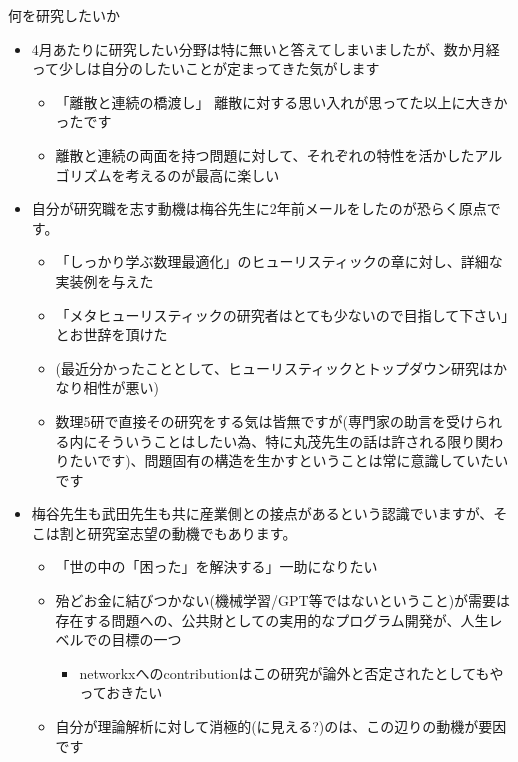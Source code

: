 \documentclass[13pt,aspectratio=169,table,dvipdfmx]{beamer}
\begin{document}
    \begin{frame}{何を研究したいか}
        \begin{itemize}
            \item 4月あたりに研究したい分野は特に無いと答えてしまいましたが、数か月経って少しは自分のしたいことが定まってきた気がします
                  \begin{itemize}
                      \item 「離散と連続の橋渡し」 離散に対する思い入れが思ってた以上に大きかったです
                      \item 離散と連続の両面を持つ問題に対して、それぞれの特性を活かしたアルゴリズムを考えるのが最高に楽しい
                  \end{itemize}
            \item 自分が研究職を志す動機は梅谷先生に2年前メールをしたのが恐らく原点です。
                  \begin{itemize}
                      \item 「しっかり学ぶ数理最適化」のヒューリスティックの章に対し、詳細な実装例を与えた
                      \item 「メタヒューリスティックの研究者はとても少ないので目指して下さい」とお世辞を頂けた
                      \item (最近分かったこととして、ヒューリスティックとトップダウン研究はかなり相性が悪い)
                      \item 数理5研で直接その研究をする気は皆無ですが(専門家の助言を受けられる内にそういうことはしたい為、特に丸茂先生の話は許される限り関わりたいです)、問題固有の構造を生かすということは常に意識していたいです
                  \end{itemize}
            \item 梅谷先生も武田先生も共に産業側との接点があるという認識でいますが、そこは割と研究室志望の動機でもあります。
                  \begin{itemize}
                      \item 「世の中の「困った」を解決する」一助になりたい
                      \item 殆どお金に結びつかない(機械学習/GPT等ではないということ)が需要は存在する問題への、公共財としての実用的なプログラム開発が、人生レベルでの目標の一つ
                            \begin{itemize}
                                \item networkxへのcontributionはこの研究が論外と否定されたとしてもやっておきたい
                            \end{itemize}
                      \item 自分が理論解析に対して消極的(に見える?)のは、この辺りの動機が要因です
                  \end{itemize}
        \end{itemize}
    \end{frame}
\end{document}
